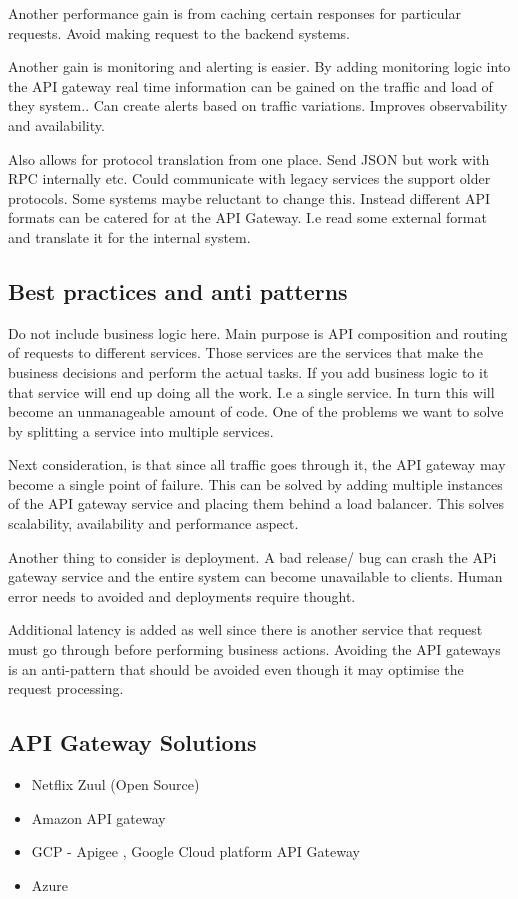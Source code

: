 Another performance gain is from caching certain responses for particular requests.
Avoid making request to the backend systems.

Another gain is monitoring and alerting is easier.
By adding monitoring logic into the API gateway real time information can be gained on the traffic and load of they system..
Can create alerts based on traffic variations.
Improves observability and availability.

Also allows for protocol translation from one place.
Send JSON but work with RPC internally etc.
Could communicate with legacy services the support older protocols.
Some systems maybe reluctant to change this.
Instead different API formats can be catered for at the API Gateway.
I.e read some external format and translate it for the internal system.

\subsection{Best practices and anti patterns}
Do not include business logic here.
Main purpose is API composition and routing of requests to different services.
Those services are the services that make the business decisions and perform the actual tasks.
If you add business logic to it that service will end up doing all the work.
I.e a single service.
In turn this will become an unmanageable amount of code.
One of the problems we want to solve by splitting a service into multiple services.

Next consideration, is that since all traffic goes through it, the API gateway may become a single point of failure.
This can be solved by adding multiple instances of the API gateway service and placing them behind a load balancer.
This solves scalability, availability and performance aspect.

Another thing to consider is deployment.
A bad release/ bug can crash the APi gateway service and the entire system can become unavailable to clients.
Human error needs to avoided and deployments require thought.

Additional latency is added as well since there is another service that request must go through before performing business actions.
Avoiding the API gateways is an anti-pattern that should be avoided even though it may optimise the request processing.

\subsection{API Gateway Solutions}
\begin{itemize}
    \item Netflix Zuul (Open Source)
    \item Amazon API gateway
    \item GCP - Apigee , Google Cloud platform API Gateway
    \item Azure
\end{itemize}


